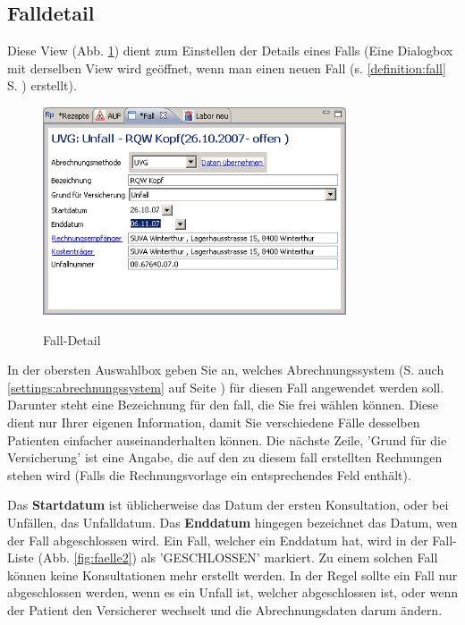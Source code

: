 \subsection{Falldetail}
\label{falldetail}
Diese View (Abb. \ref{fig:falldetail}) dient zum Einstellen der Details eines Falls (Eine Dialogbox mit derselben View wird geöffnet, wenn man einen neuen Fall (s. \ref{definition:fall} S. \pageref{definition:fall}) erstellt).
\begin{figure}
  \includegraphics[width=0.8\textwidth]{images/falldetail}\\
  \caption{Fall-Detail}\label{fig:falldetail}
\end{figure}
In der obersten Auswahlbox geben Sie an, welches Abrechnungssystem (S. auch \ref{settings:abrechnungssystem} auf Seite \pageref{settings:abrechnungssystem}) für diesen Fall angewendet werden soll. Darunter steht eine Bezeichnung für den fall, die Sie frei wählen können. Diese dient nur Ihrer eigenen Information, damit Sie verschiedene Fälle desselben Patienten einfacher auseinanderhalten können. Die nächste Zeile, 'Grund für die Versicherung' ist eine Angabe, die auf den zu diesem fall erstellten Rechnungen stehen wird (Falls die Rechnungsvorlage ein entsprechendes Feld enthält).

Das \textbf{Startdatum} ist üblicherweise das Datum der ersten Konsultation, oder bei Unfällen, das Unfalldatum. Das \textbf{Enddatum} hingegen bezeichnet das Datum, wen der Fall abgeschlossen wird. Ein Fall, welcher ein Enddatum hat, wird in der Fall-Liste (Abb. \ref{fig:faelle2}) als 'GESCHLOSSEN' markiert. Zu einem solchen Fall können keine Konsultationen mehr erstellt werden.
In der Regel sollte ein Fall nur abgeschlossen werden, wenn es ein Unfall ist, welcher abgeschlossen ist, oder wenn der Patient den Versicherer wechselt und die Abrechnungsdaten darum ändern.

